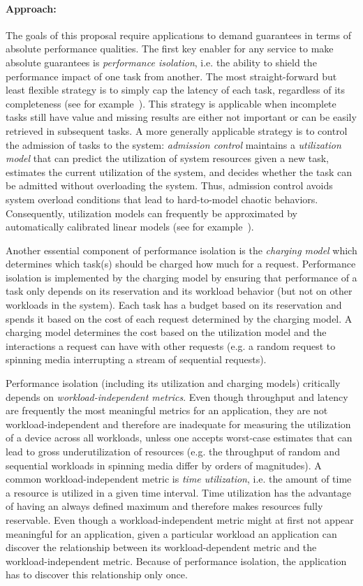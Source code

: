 \paragraph{Approach:} The goals of this proposal require applications
to demand guarantees in terms of absolute performance qualities.
The first key enabler for any service to make absolute guarantees
is \emph{performance isolation}, i.e. the ability to shield the
performance impact of one task from another. The most straight-forward
but least flexible strategy is to simply cap the latency of each
task, regardless of its completeness (see for
example~\cite{decandia:sosp07}). This strategy is applicable when
incomplete tasks still have value and missing results are either
not important or can be easily retrieved in subsequent tasks. A
more generally applicable strategy is to control the admission of
tasks to the system: \emph{admission control} maintains a
\emph{utilization model} that can predict the utilization of system
resources given a new task, estimates the current utilization of
the system, and decides whether the task can be admitted without
overloading the system. Thus, admission control avoids system
overload conditions that lead to hard-to-model chaotic behaviors.
Consequently, utilization models can frequently be approximated by
automatically calibrated linear models (see for
example~\cite{skourtis:hpdc12}).

Another essential component of performance isolation is the
\emph{charging model} which determines which task(s) should be
charged how much for a request. Performance isolation is implemented
by the charging model by ensuring that performance of a task only
depends on its reservation and its workload behavior (but not on
other workloads in the system). Each task has a budget based on its
reservation and spends it based on the cost of each request determined
by the charging model. A charging model determines the cost based
on the utilization model and the interactions a request can have
with other requests (e.g. a random request to spinning media
interrupting a stream of sequential requests).

Performance isolation (including its utilization and charging models)
critically depends on \emph{workload-independent metrics}. Even
though throughput and latency are frequently the most meaningful
metrics for an application, they are not workload-independent and
therefore are inadequate for measuring the utilization of a device
across all workloads, unless one accepts worst-case estimates that
can lead to gross underutilization of resources (e.g. the throughput
of random and sequential workloads in spinning media differ by
orders of magnitudes). A common workload-independent metric is
\emph{time utilization}, i.e. the amount of time a resource is
utilized in a given time interval. Time utilization has the advantage
of having an always defined maximum and therefore makes resources
fully reservable. Even though a workload-independent metric might
at first not appear meaningful for an application, given a particular
workload an application can discover the relationship between its
workload-dependent metric and the workload-independent metric.
Because of performance isolation, the application has to discover
this relationship only once.

